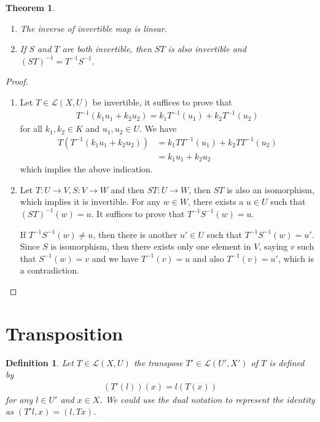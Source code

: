 \documentclass[11pt]{book}
\newtheorem{definition}{Definition}[section]
\newtheorem{theorem}{Theorem}[section]
\theoremstyle{definition}
\numberwithin{equation}{subsection}
\begin{document}
\begin{theorem}
~\begin{enumerate}[label=(\arabic*)]
    \item The inverse of invertible map is linear.
    \item If $S$ and $T$ are both invertible, then $ST$ is also invertible and $(ST)^{-1} = T^{-1} S^{-1}$.
\end{enumerate}
\end{theorem}
\begin{proof}
~\begin{enumerate}[label=(\arabic*)]
    \item Let $T\in \mathscr{L}(X,U)$ be invertible, it suffices to prove that 
    \begin{align*}
        T^{-1}(k_1 u_1+k_2 u_2) = k_1 T^{-1}(u_1) + k_2 T^{-1}(u_2)
    \end{align*}
    for all $k_1,k_2\in K$ and $u_1,u_2\in U$. We have
    \begin{align*}
        T \left(T^{-1}(k_1 u_1+k_2 u_2)\right) & = k_1 TT^{-1}(u_1) + k_2 TT^{-1}(u_2) \\
        & = k_1 u_1 + k_2 u_2
    \end{align*}
    which implies the above indication.
    \item Let $T:U\to V, S:V\to W$ and then $ST:U\to W$, then $ST$ is also an isomorphism, which implies it is invertible. For any $w\in W$, there exists a $u\in U$ such that $(ST)^{-1}(w) = u$. It suffices to prove that $T^{-1} S^{-1}(w) = u$.
    
    If $T^{-1} S^{-1}(w)\neq u$, then there is another $u'\in U$ such that $T^{-1} S^{-1}(w) = u'$. Since $S$ is isomorphism, then there exists only one element in $V$, saying $v$ such that $S^{-1}(w) = v$ and we have $T^{-1}(v) = u$ and also $T^{-1}(v) = u'$, which is a contradiction.
\end{enumerate}
\end{proof}

\medskip

\section{Transposition}
\begin{definition}
Let $T\in \mathscr{L}(X,U)$ the transpose $T'\in \mathscr{L}(U',X')$ of $T$ is defined by 
\begin{align*}
    \left(T'(l)\right)(x) = l(T(x))
\end{align*}
for any $l\in U'$ and $x\in X$. We could use the dual notation to represent the identity as $(T' l,x) = (l, Tx)$.
\end{definition}
\end{document}
